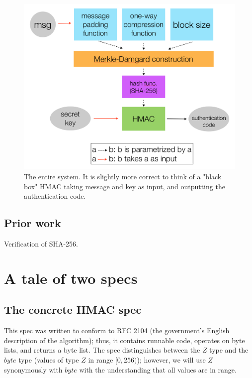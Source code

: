 \documentclass[twocolumn,showpacs,%
  nofootinbib,aps,superscriptaddress,%
  eqsecnum,prd,notitlepage,showkeys,10pt]{revtex4-1}
\begin{document}
\begin{figure}[h!]
	\centering
	\includegraphics[scale=0.4]{Cryptosystem}
	\caption{The entire system. It is slightly more correct to think of a "black box" HMAC taking message and key as input, and outputting the authentication code.}
\end{figure}

\subsection{Prior work}

Verification of SHA-256.


\section{A tale of two specs}

\subsection{The concrete HMAC spec}

This spec was written to conform to RFC 2104 (the government's English description of the algorithm); thus, it contains runnable code, operates on byte lists, and returns a byte list. The spec distinguishes between the $Z$ type and the $byte$ type (values of type $Z$ in range $[0, 256)$); however, we will use $Z$ synonymously with $byte$ with the understanding that all values are in range.
\end{document}
